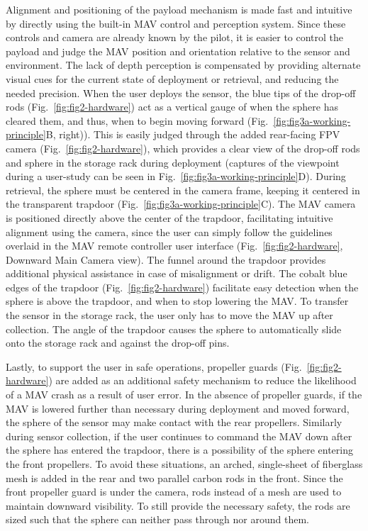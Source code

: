 Alignment and positioning of the payload mechanism is made fast and intuitive by directly using the built-in \ac{MAV} control and perception system.
Since these controls and camera are already known by the pilot, it is easier to control the payload and judge the \ac{MAV} position and orientation relative to the sensor and environment. The lack of depth perception is compensated by providing alternate visual cues for the current state of deployment or retrieval, and reducing the needed precision. When the user deploys the sensor, the blue tips of the drop-off rods (Fig.~\ref{fig:fig2-hardware}) act as a vertical gauge of when the sphere has cleared them, and thus, when to begin moving forward (Fig.~\ref{fig:fig3a-working-principle}B, right)). This is easily judged through the added rear-facing \ac{FPV} camera (Fig.~\ref{fig:fig2-hardware}), which provides a clear view of the drop-off rods and sphere in the storage rack during deployment (captures of the viewpoint during a user-study can be seen in Fig.~\ref{fig:fig3a-working-principle}D).
During retrieval, the sphere must be centered in the camera frame, keeping it centered in the transparent trapdoor (Fig.~\ref{fig:fig3a-working-principle}C). The \ac{MAV} camera is positioned directly above the center of the trapdoor, facilitating intuitive alignment using the camera, since the user can simply follow the guidelines overlaid in the \ac{MAV} remote controller user interface (Fig.~\ref{fig:fig2-hardware}, Downward Main Camera view). The funnel around the trapdoor provides additional physical assistance in case of misalignment or drift. The cobalt blue edges of the trapdoor (Fig.~\ref{fig:fig2-hardware}) facilitate easy detection when the sphere is above the trapdoor, and when to stop lowering the MAV. To transfer the sensor in the storage rack, the user only has to move the \ac{MAV} up after collection. The angle of the trapdoor causes the sphere to automatically slide onto the storage rack and against the drop-off pins.

Lastly, to support the user in safe operations, propeller guards (Fig.~\ref{fig:fig2-hardware}) are added as an additional safety mechanism to reduce the likelihood of a \ac{MAV} crash as a result of user error. In the absence of propeller guards, if the \ac{MAV} is lowered further than necessary during deployment and moved forward, the sphere of the sensor may make contact with the rear propellers. Similarly during sensor collection, if the user continues to command the \ac{MAV} down after the sphere has entered the trapdoor, there is a possibility of the sphere entering the front propellers. To avoid these situations, an arched, single-sheet of fiberglass mesh is added in the rear and two parallel carbon rods in the front. Since the front propeller guard is under the camera, rods instead of a mesh are used to maintain downward visibility. To still provide the necessary safety, the rods are sized such that the sphere can neither pass through nor around them.

